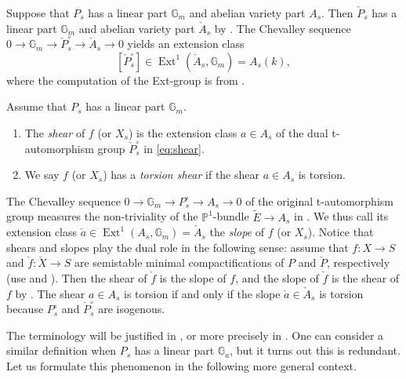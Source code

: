 \documentclass[reqno, letterpaper]{amsart}
\numberwithin{equation}{subsection}
\let\to\longrightarrow
\newcommand{\GG}{\mathbb{G}}
\newcommand{\PP}{\mathbb{P}}
\DeclareMathOperator{\Ext}{Ext}
\begin{document}
		Suppose that $P_s$ has a linear part $\GG_m$ and abelian variety part $A_s$. Then $\check P_s$ has a linear part $\GG_m$ and abelian variety part $\check A_s$ by . The Chevalley sequence $0 \to \GG_m \to \check P^\circ_s \to \check A_s \to 0$ yields an extension class
		\begin{equation} \label{eq:shear}
			[\check P^\circ_s] \in \Ext^1 (\check A_s, \GG_m) = A_s(k) ,
		\end{equation}
		where the computation of the Ext-group is from \cite[\S VII.3.16]{serre:class_field}.
		
		\begin{definition} \label{def:shear}
			Assume that $P_s$ has a linear part $\GG_m$.
			\begin{enumerate}
				\item The \emph{shear} of $f$ (or $X_s$) is the extension class $a \in A_s$ of the dual t-automorphism group $\check P^\circ_s$ in \eqref{eq:shear}.
				\item We say $f$ (or $X_s$) has a \emph{torsion shear} if the shear $a \in A_s$ is torsion.
			\end{enumerate}
		\end{definition}
		
		\begin{remark}
			The Chevalley sequence $0 \to \GG_m \to P^\circ_s \to A_s \to 0$ of the original t-automorphism group measures the non-triviality of the $\PP^1$-bundle $\tilde E \to A_s$ in . We thus call its extension class $\check a \in \Ext^1 (A_s, \GG_m) = \check A_s$ the \emph{slope} of $f$ (or $X_s$). Notice that shears and slopes play the dual role in the following sense: assume that $f : X \to S$ and $\check f : \check X \to S$ are semistable minimal compactifications of $P$ and $\check P$, respectively (use  and ). Then the shear of $\check f$ is the slope of $f$, and the slope of $\check f$ is the shear of $f$ by . The shear $a \in A_s$ is torsion if and only if the slope $\check a \in \check A_s$ is torsion because $P_s^\circ$ and $\check P_s^\circ$ are isogenous.
		\end{remark}
		
		The terminology will be justified in , or more precisely in . One can consider a similar definition when $P_s$ has a linear part $\GG_a$, but it turns out this is redundant. Let us formulate this phenomenon in the following more general context.
		
\end{document}

